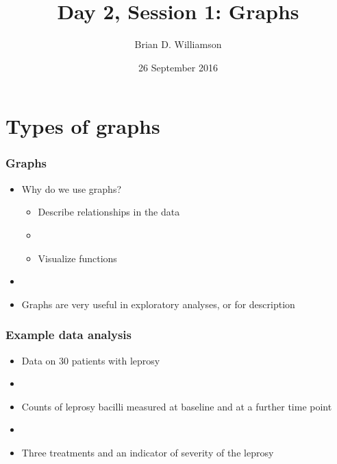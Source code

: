\documentclass[11pt]{beamer}
\title{Day 2, Session 1: Graphs}
\author{Brian D. Williamson}
\institute{EPI/BIOST Bootcamp 2016}
\date{26 September 2016}
\newcommand{\myframe}[1]{\begin{frame} \frametitle{#1}}
\begin{document}
\begin{frame}
\titlepage
\end{frame}

\section{Types of graphs}
\myframe{Graphs}
\begin{itemize}
\item Why do we use graphs?
\begin{itemize}
\item Describe relationships in the data
\item[]
\item Visualize functions
\end{itemize}
\item[]
\item Graphs are very useful in exploratory analyses, or for description
\end{itemize}
\end{frame}

\myframe{Example data analysis}
\begin{itemize}
\item Data on 30 patients with leprosy
\item[]
\item Counts of leprosy bacilli measured at baseline and at a further time point
\item[]
\item Three treatments and an indicator of severity of the leprosy
\end{itemize}
\end{frame}
\end{document}
